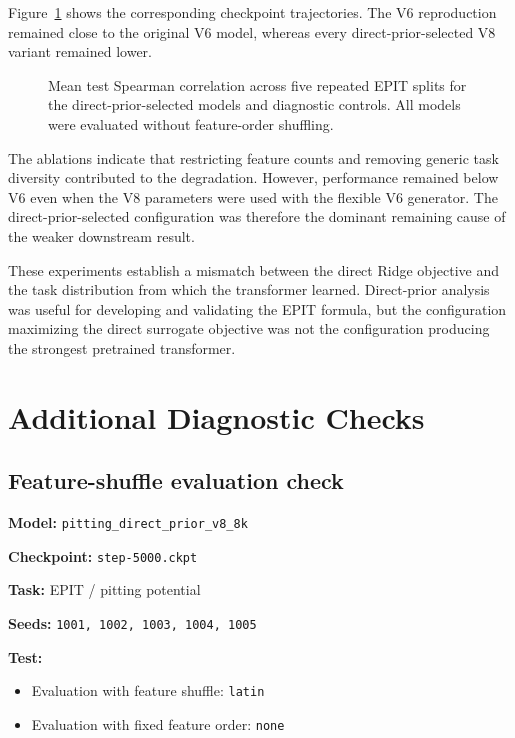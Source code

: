 \documentclass{article}
\begin{document}
Figure~\ref{fig:direct-prior-fixed-schema-spearman} shows the corresponding checkpoint trajectories. The V6 reproduction remained close to the original V6 model, whereas every direct-prior-selected V8 variant remained lower.

\begin{figure}[htbp]
    \centering
    
    \caption{Mean test Spearman correlation across five repeated EPIT splits for the direct-prior-selected models and diagnostic controls. All models were evaluated without feature-order shuffling.}
    \label{fig:direct-prior-fixed-schema-spearman}
\end{figure}

The ablations indicate that restricting feature counts and removing generic task diversity contributed to the degradation. However, performance remained below V6 even when the V8 parameters were used with the flexible V6 generator. The direct-prior-selected configuration was therefore the dominant remaining cause of the weaker downstream result.

These experiments establish a mismatch between the direct Ridge objective and the task distribution from which the transformer learned. Direct-prior analysis was useful for developing and validating the EPIT formula, but the configuration maximizing the direct surrogate objective was not the configuration producing the strongest pretrained transformer.


\section{Additional Diagnostic Checks}

\subsection{Feature-shuffle evaluation check}

\textbf{Model:} \texttt{pitting\_direct\_prior\_v8\_8k}

\textbf{Checkpoint:} \texttt{step-5000.ckpt}

\textbf{Task:} EPIT / pitting potential

\textbf{Seeds:} \texttt{1001, 1002, 1003, 1004, 1005}

\textbf{Test:}
\begin{itemize}
    \item Evaluation with feature shuffle: \texttt{latin}
    \item Evaluation with fixed feature order: \texttt{none}
\end{itemize}
\end{document}
